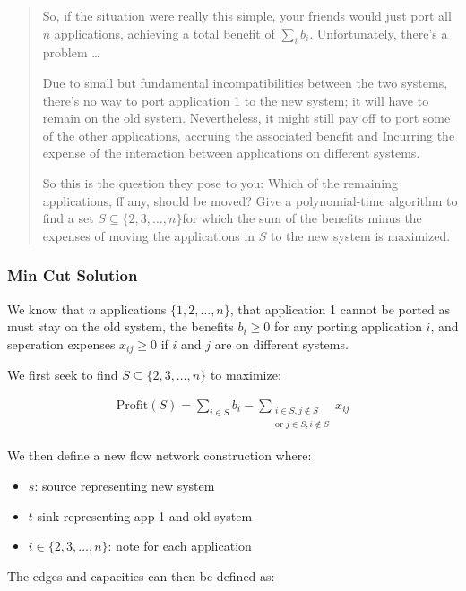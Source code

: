 \documentclass[
]{article}
\providecommand{\tightlist}{%
  \setlength{\itemsep}{0pt}\setlength{\parskip}{0pt}}
\begin{document}
\begin{quote}
So, if the situation were really this simple, your friends would just
port all \(n\) applications, achieving a total benefit of
\(\sum_{i}b_{i}\). Unfortunately, there's a problem \ldots{}

Due to small but fundamental incompatibilities between the two systems,
there's no way to port application 1 to the new system; it will have to
remain on the old system. Nevertheless, it might still pay off to port
some of the other applications, accruing the associated benefit and
Incurring the expense of the interaction between applications on
different systems.

So this is the question they pose to you: Which of the remaining
applications, ff any, should be moved? Give a polynomial-time algorithm
to find a set \(S \subseteq \{ 2,3,\dots,n \}\)for which the sum of the
benefits minus the expenses of moving the applications in \(S\) to the
new system is maximized.
\end{quote}

\subsubsection{Min Cut Solution}\label{min-cut-solution}

We know that \(n\) applications \(\{ 1,2,\dots ,n \}\), that application
1 cannot be ported as must stay on the old system, the benefits
\(b_{i} \geq 0\) for any porting application \(i\), and seperation
expenses \(x_{ij}\geq 0\) if \(i\) and \(j\) are on different systems.

We first seek to find \(S \subseteq \{ 2,3,\dots, n \}\) to maximize:

\[
\begin{align} \text{Profit}(S) = \sum_{i \in S} b_i - \sum_{\substack{i \in S, j \notin S \\ \text{or } j \in S, i \notin S}} x_{ij} \end{align}
\]

We then define a new flow network construction where:

\begin{itemize}
\tightlist
\item
  \(s\): source representing new system
\item
  \(t\) sink representing app 1 and old system
\item
  \(i \in \{ 2,3,\dots,n \}\): note for each application
\end{itemize}

The edges and capacities can then be defined as:
\end{document}
